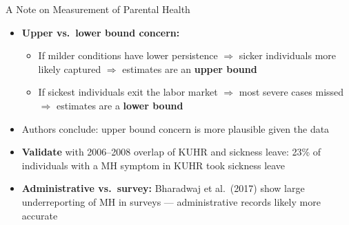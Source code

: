 \documentclass[aspectratio=169]{beamer}
\begin{document}
\begin{frame}{A Note on Measurement of Parental Health}
  \begin{itemize}
    \item \textbf{Upper vs.\ lower bound concern:}
    \begin{itemize}
      \item If milder conditions have lower persistence $\Rightarrow$ sicker individuals more likely captured $\Rightarrow$ estimates are an \textbf{upper bound}
      \item If sickest individuals exit the labor market $\Rightarrow$ most severe cases missed $\Rightarrow$ estimates are a \textbf{lower bound}
    \end{itemize}
    \item Authors conclude: upper bound concern is more plausible given the data
    \item \textbf{Validate} with 2006--2008 overlap of KUHR and sickness leave: 23\% of individuals with a MH symptom in KUHR took sickness leave
    \item \textbf{Administrative vs.\ survey:} Bharadwaj et al.\ (2017) show large underreporting of MH in surveys --- administrative records likely more accurate
  \end{itemize}
\end{frame}
\end{document}
